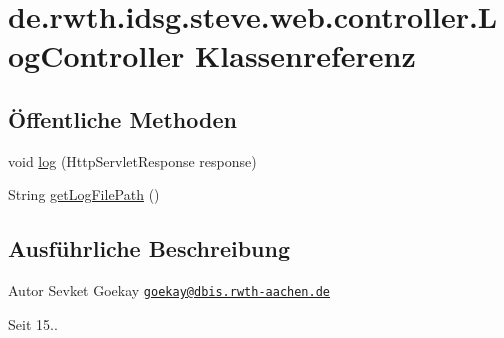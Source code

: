 \hypertarget{classde_1_1rwth_1_1idsg_1_1steve_1_1web_1_1controller_1_1_log_controller}{\section{de.\-rwth.\-idsg.\-steve.\-web.\-controller.\-Log\-Controller Klassenreferenz}
\label{classde_1_1rwth_1_1idsg_1_1steve_1_1web_1_1controller_1_1_log_controller}
}
\subsection*{Öffentliche Methoden}
\begin{DoxyCompactItemize}
\item 
void \hyperlink{classde_1_1rwth_1_1idsg_1_1steve_1_1web_1_1controller_1_1_log_controller_aefb405a2f3dbe5df825488ae0db29f2d}{log} (Http\-Servlet\-Response response)
\item 
String \hyperlink{classde_1_1rwth_1_1idsg_1_1steve_1_1web_1_1controller_1_1_log_controller_acaf6e7d8e714bf68765e614c4c9d0b64}{get\-Log\-File\-Path} ()
\end{DoxyCompactItemize}


\subsection{Ausführliche Beschreibung}
\begin{DoxyAuthor}{Autor}
Sevket Goekay \href{mailto:goekay@dbis.rwth-aachen.de}{\tt goekay@dbis.\-rwth-\/aachen.\-de} 
\end{DoxyAuthor}
\begin{DoxySince}{Seit}
15.. 
\end{DoxySince}


